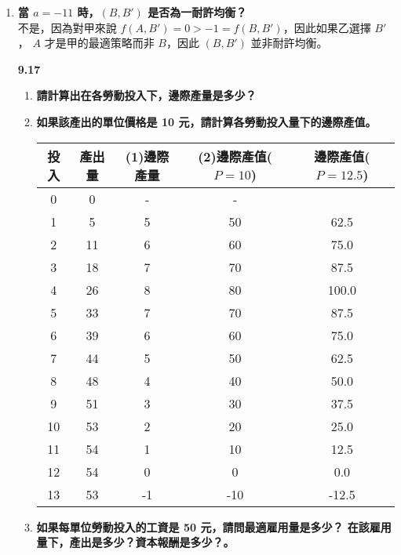 \documentclass[12pt, a4paper]{article}
\begin{document}
\begin{enumerate}[label={\bf 8.\arabic*}]
  \item {\bf 當 $a = -11$ 時，$(B, B')$ 是否為一耐許均衡？\\}
    不是，因為對甲來說 $f(A, B') = 0 > -1 = f(B, B')$，因此如果乙選擇 $B'$，
    $A$ 才是甲的最適策略而非 $B$，因此 $(B, B')$ 並非耐許均衡。
  \item[{\bf 9.17}] 
    \begin{enumerate}[label={\bf (\arabic*)}]
      \item {\bf 請計算出在各勞動投入下，邊際產量是多少？}
      \item {\bf 如果該產出的單位價格是 10 元，請計算各勞動投入量下的邊際產值。} 
        \begin{table}[H]
          \centering
          \begin{tabular}{c|c|c|c|c}
            投入 & 產出量 & {\bf (1)}邊際產量 & {\bf (2)}邊際產值($P = 10$) & 邊際產值($P = 12.5$) \\
            \hline
            0 & 0 & - & - \\
            \hline
            1 & 5 & 5 & 50 & 62.5 \\
            \hline
            2 & 11 & 6 & 60 & 75.0 \\
            \hline
            3 & 18 & 7 & 70 & 87.5 \\
            \hline
            4 & 26 & 8 & 80 & 100.0 \\
            \hline
            5 & 33 & 7 & 70 & 87.5 \\
            \hline
            6 & 39 & 6 & 60 & 75.0 \\
            \hline
            7 & 44 & 5 & 50 & 62.5 \\
            \hline
            8 & 48 & 4 & 40 & 50.0 \\
            \hline
            9 & 51 & 3 & 30 & 37.5 \\
            \hline
            10 & 53 & 2 & 20 & 25.0 \\
            \hline
            11 & 54 & 1 & 10 & 12.5 \\
            \hline
            12 & 54 & 0 & 0 & 0.0 \\
            \hline
            13 & 53 & -1 & -10 & -12.5 \\
            \hline
          \end{tabular}
        \end{table}
      \item {\bf 如果每單位勞動投入的工資是 50 元，請問最適雇用量是多少？
          在該雇用量下，產出是多少？資本報酬是多少？。\\[10pt]} 

\end{enumerate}
\end{enumerate}
\end{document}
